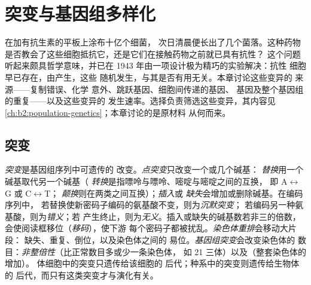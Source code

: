 \chapter{突变与基因组多样化}\label{ch:b2:genome-diversification}

在加有抗生素的平板上涂布十亿个细菌，
次日清晨便长出了几个菌落。这种药物
是否教会了这些细胞抵抗它，还是它们在接触药物之前就已具有抗性？
这个问题听起来颇具哲学意味，并已在
1943 年由一项设计极为精巧的实验解决：抗性
细胞早已存在，由产生，这些
随机发生，与其是否有用无关。本章讨论这些变异的
来源——复制错误、化学
意外、跳跃基因、细胞间传递的基因、
基因及整个基因组的重复——以及这些变异的
发生速率。选择负责筛选这些变异，其内容见
\cref{ch:b2:population-genetics}；本章讨论的是原材料
从何而来。

\section{突变}

\begin{definition}[突变及其类型]\label{def:b2:genome-diversification:mutation}
\emph{突变}是基因组序列中可遗传的
改变。\emph{点突变}只改变一个或几个碱基：
\emph{替换}用一个碱基取代另一个碱基（
\emph{转换}是指嘌呤与嘌呤、嘧啶与嘧啶之间的互换，
即 A$\leftrightarrow$G 或 C$\leftrightarrow$T；
\emph{颠换}则在两类之间互换）；\emph{插入}或
\emph{缺失}会增加或删除碱基。在编码序列中，
若替换使新密码子编码的氨基酸不变，则为\emph{沉默突变}；
若编码另一种氨基酸，则为\emph{错义}；若
产生终止，则为\emph{无义}。插入或缺失的碱基数若非三的倍数，
会使阅读框移位（\emph{移码}），使下游
每个密码子都被扰乱。\emph{染色体重排}会移动大片段：
缺失、重复、倒位，以及染色体之间的
易位。\emph{基因组突变}会改变染色体的
数目：\emph{非整倍性}（比正常数目多或少一条染色体，
如 21 三体）以及\emph{}（整套染色体的增加）。
体细胞中的突变只遗传给该细胞的
后代；种系中的突变则遗传给生物体的
后代，而只有这类突变才与演化有关。
\end{definition}


